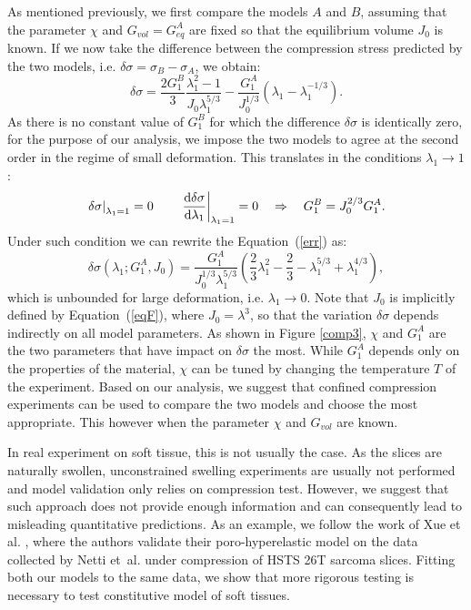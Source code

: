 As mentioned previously, we first compare the models $A$ and $B$, assuming that the parameter $\chi$ and $G_{vol}=G^A_{eq}$ are fixed so that the equilibrium volume $J_0$ is known. If we now take the difference between the compression stress predicted by the two models, i.e. $\delta \sigma= \sigma_{B}-\sigma_{A}$, we obtain:
\begin{equation}
\delta \sigma = \frac{2 G_1^{B}}{3} \frac{\lambda_1^2-1}{J_0\lambda_1^{5/3}} - \frac{G_1^A}{J_0^{1/3}}(\lambda_1-\lambda_1^{-1/3}).\label{err}
\end{equation}
As there is no constant value of $G^{B}_1$ for which the difference $\delta \sigma$ is identically zero, for the purpose of our analysis, we impose the two models to agree at the second order in the regime of small deformation. This translates in the conditions $\lambda_1\rightarrow 1$:
\begin{equation}
\left.\delta \sigma\right|_{\lambda_1=1}=0 \qquad \left.\frac{\text{d} \delta \sigma}{\text{d} \lambda_1}\right|_{\lambda_1=1}=0 \quad\Rightarrow \quad G_1^{B} = J_0^{2/3}G_1^A.
\end{equation}
Under such condition we can rewrite the Equation~(\ref{err}) as:
\begin{equation}
\delta \sigma(\lambda_1;G^A_1,J_0) = \frac{G_1^A}{J^{1/3}_0\lambda_1^{5/3}} \left(\frac{2}{3}\lambda^2_1-\frac{2}{3}-\lambda_1^{5/3}+\lambda_1^{4/3}\right), 
\end{equation}
which is unbounded for large deformation, i.e. $\lambda_1\rightarrow0$. Note that $J_0$ is implicitly defined by Equation~(\ref{eqF}), where $J_0=\lambda^3$, so that the variation $\delta\sigma$ depends indirectly on all model parameters. As shown in Figure \ref{comp3}, $\chi$ and $G_1^A$ are the two parameters that have impact on $\delta\sigma$ the most. While $G_1^A$ depends only on the properties of the material, $\chi$ can be tuned by changing the temperature $T$ of the experiment. Based on our analysis, we suggest that confined compression experiments can be used to compare the two models and choose the most appropriate. This however when the parameter $\chi$ and $G_{vol}$ are known. 

In real experiment on soft tissue, this is not usually the case. As the slices are naturally swollen, unconstrained swelling experiments are usually not performed and model validation only relies on compression test. However, we suggest that such approach does not provide enough information and can consequently lead to misleading quantitative predictions. As an example, we follow the work of Xue et al. \cite{ecm2}, where the authors validate their poro-hyperelastic model on the data collected by Netti et~al. \cite{Netti} under compression of HSTS 26T sarcoma slices. Fitting both our models to the same data, we show that more rigorous testing is necessary to test constitutive model of soft tissues.
